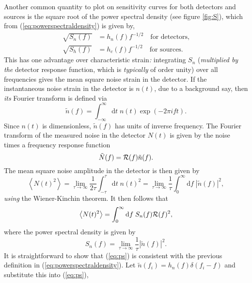 Another common quantity to plot on sensitivity curves for both detectors and sources is the square root of the power spectral density (see figure \ref{fig:S}), which from (\ref{eq:powerspectraldensity}) is given by,
\begin{eqnarray}\label{eq:temp1}
 \sqrt{{S}_{n}(f)}&=h_{n}(f)f^{-1/2} \quad\textrm{for detectors,} \nonumber \\
\sqrt{S_{h}(f)}&=h_{c}(f)f^{-1/2} \quad\textrm{for sources.}
\end{eqnarray}
This has one advantage over characteristic strain\emph{:} integrating $S_{n}$ (\emph{multiplied by the} detector response function, which is \emph{typically} of order unity) over all frequencies gives the mean square noise strain in the detector. If the instantaneous noise strain in the detector is $n(t)$, due to a background say, then \emph{its} Fourier transform is defined via
\begin{equation}\label{eq:FT}
\tilde{n}(f)=\int_{-\infty}^{\infty}\textrm{d}t\; n(t)\exp \left(-2\pi ift\right).
\end{equation}
Since $n(t)$ is dimensionless, $\tilde{n}(f)$ has units of inverse frequency. The Fourier transform of the measured noise in the detector $N(t)$ is given by the noise times a frequency response function
\begin{equation}\tilde{N}(f)={\cal{R}}(f)\tilde{n}(f).
\end{equation}
The mean square noise amplitude in the detector is then given by
\begin{equation}
\left< N(t)^{2} \right> = \lim_{\tau \rightarrow \infty} \frac{1}{2\tau} \int_{-\tau}^{\tau}\textrm{d}t\;n(t)^{2}=\lim_{\tau\rightarrow\infty}\frac{1}{\tau}\int_{0}^{\infty}\textrm{d}f\;\left|\tilde{n}(f)\right|^{2},
\end{equation}
\emph{using} the Wiener-Kinchin theorem. It then follows that
\begin{equation}\label{eq:meansquare}
\left< N(t)^{2} \right> = \int_{0}^{\infty}\textrm{d}f\; S_{n}(f){\cal{R}}(f)^{2},
\end{equation}
where the power spectral density is given by
\begin{equation}\label{eq:ps}
S_{n}(f)=\lim_{\tau\rightarrow\infty}\frac{1}{\tau}\left|\tilde{n}(f)\right|^{2}.
\end{equation}
It is straightforward to show that (\ref{eq:ps}) is consistent with the previous definition in (\ref{eq:powerspectraldensity}). Let $\tilde{n}(f_{i})=h_{n}(f)\delta (f_{i}-f)$ and substitute this into (\ref{eq:ps}),
